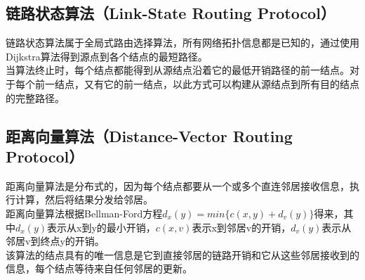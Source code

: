 \subsection{链路状态算法（Link-State Routing Protocol）}

链路状态算法属于全局式路由选择算法，所有网络拓扑信息都是已知的，通过使用Dijkstra算法得到源点到各个结点的最短路径。\\

当算法终止时，每个结点都能得到从源结点沿着它的最低开销路径的前一结点。对于每个前一结点，又有它的前一结点，以此方式可以构建从源结点到所有目的结点的完整路径。\\

\subsection{距离向量算法（Distance-Vector Routing Protocol）}

距离向量算法是分布式的，因为每个结点都要从一个或多个直连邻居接收信息，执行计算，然后将结果分发给邻居。\\

距离向量算法根据Bellman-Ford方程$ d_x(y) = min\{c(x, y) + d_v(y)\} $得来，其中$ d_x(y) $表示从x到y的最小开销，$ c(x, v) $表示x到邻居v的开销，$ d_v(y) $表示从邻居v到终点y的开销。\\

该算法的结点具有的唯一信息是它到直接邻居的链路开销和它从这些邻居接收到的信息，每个结点等待来自任何邻居的更新。

\newpage
